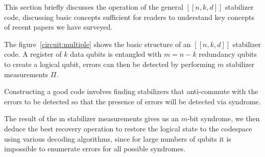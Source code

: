 
This section briefly discusses the operation of the general $[[n, k, d]]$ stabilizer code, discussing basic concepts sufficient for readers to understand key concepts of recent papers we have surveyed.

The figure~\ref{circuit:multiple} shows the basic structure of an $[[n,k,d]]$ stabilizer code. A register of $k$ data qubits is entangled with $m = n - k$ redundancy qubits to create a logical qubit, errors can then be detected by performing $m$ stabilizer measurements $\Pi$.

Constructing a good code involves finding stabilizers that anti-commute with the errors to be detected so that the presence of errors will be detected via syndrome.

The result of the m stabilizer measurements gives us an $m$-bit syndrome, we then deduce the best recovery operation to restore the logical state to the codespace using various decoding algorithms, since for large numbers of qubits it is impossible to enumerate errors for all possible syndromes.

